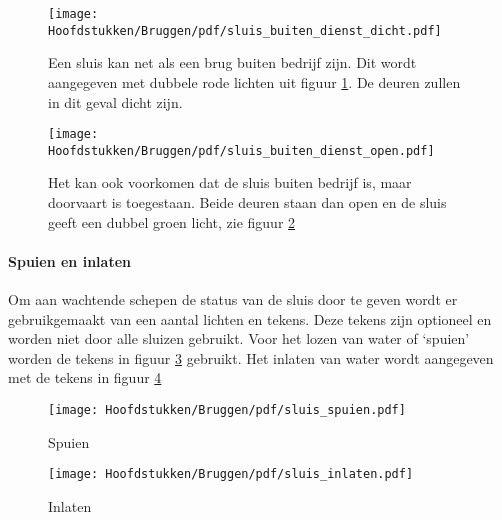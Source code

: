 \vspace{-0.35cm}
\begin{figure}[H]
	\centering
	\begin{minipage}[b]{0.18\textwidth}	
		\texttt{[image: Hoofdstukken/Bruggen/pdf/sluis\_buiten\_dienst\_dicht.pdf]}
		\caption{}
		\label{pic:sluis:buiten}
	\end{minipage}
	\hfill
	\begin{minipage}[t]{0.75\textwidth}
		\vspace{-2cm}
		Een sluis kan net als een brug buiten bedrijf zijn. Dit wordt aangegeven met dubbele rode lichten uit figuur \ref{pic:sluis:buiten}. De deuren zullen in dit geval dicht zijn.
	\end{minipage}
\end{figure}
\vspace{-0.35cm}
\begin{figure}[H]
	\centering
	\begin{minipage}[b]{0.18\textwidth}	
		\texttt{[image: Hoofdstukken/Bruggen/pdf/sluis\_buiten\_dienst\_open.pdf]}
		\caption{}
		\label{pic:sluis:buiten_toegestaan}
	\end{minipage}
	\hfill
	\begin{minipage}[t]{0.75\textwidth}
		\vspace{-2cm}
		Het kan ook voorkomen dat de sluis buiten bedrijf is, maar doorvaart is toegestaan. Beide deuren staan dan open en de sluis geeft een dubbel groen licht, zie figuur \ref{pic:sluis:buiten_toegestaan}
	\end{minipage}
\end{figure}
\paragraph{Spuien en inlaten}
Om aan wachtende schepen de status van de sluis door te geven wordt er gebruikgemaakt van een aantal lichten en tekens. Deze tekens zijn optioneel en worden niet door alle sluizen gebruikt. Voor het lozen van water of `spuien' worden de tekens in figuur \ref{pic:sluis:spuien} gebruikt. Het inlaten van water wordt aangegeven met de tekens in figuur \ref{pic:sluis:inlaten}

  \begin{center}
	\begin{minipage}[b]{0.40\textwidth}
		\begin{figure}[H]
			\centering
			\texttt{[image: Hoofdstukken/Bruggen/pdf/sluis\_spuien.pdf]}
			\caption{Spuien}
			\label{pic:sluis:spuien}
		\end{figure}
	\end{minipage}
	\hspace{1cm}
	\begin{minipage}[b]{0.40\textwidth}
		\begin{figure}[H]
			\centering
			\texttt{[image: Hoofdstukken/Bruggen/pdf/sluis\_inlaten.pdf]}
			\caption{Inlaten}
			\label{pic:sluis:inlaten}
		\end{figure}
	\end{minipage}
\end{center}

